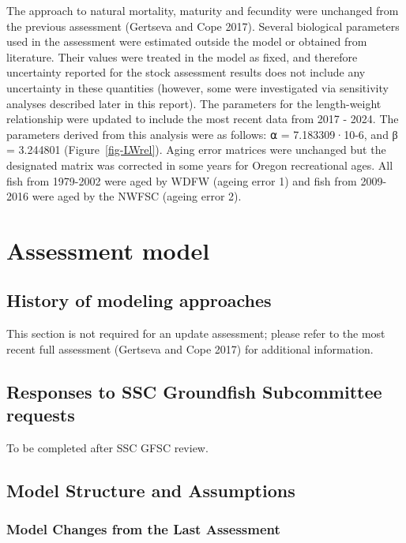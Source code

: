 \documentclass[
]{scrartcl}
\begin{document}
The approach to natural mortality, maturity and fecundity were unchanged
from the previous assessment (Gertseva and Cope 2017). Several
biological parameters used in the assessment were estimated outside the
model or obtained from literature. Their values were treated in the
model as fixed, and therefore uncertainty reported for the stock
assessment results does not include any uncertainty in these quantities
(however, some were investigated via sensitivity analyses described
later in this report). The parameters for the length-weight relationship
were updated to include the most recent data from 2017 - 2024. The
parameters derived from this analysis were as follows: ⍺ =
7.183309·10-6, and β = 3.244801 (Figure~\ref{fig-LWrel}). Aging error
matrices were unchanged but the designated matrix was corrected in some
years for Oregon recreational ages. All fish from 1979-2002 were aged by
WDFW (ageing error 1) and fish from 2009-2016 were aged by the NWFSC
(ageing error 2).

\newpage{}

\section{Assessment model}\label{assessment-model}

\subsection{History of modeling
approaches}\label{history-of-modeling-approaches}

This section is not required for an update assessment; please refer to
the most recent full assessment (Gertseva and Cope 2017) for additional
information.

\subsection{Responses to SSC Groundfish Subcommittee
requests}\label{responses-to-ssc-groundfish-subcommittee-requests}

To be completed after SSC GFSC review.

\subsection{Model Structure and
Assumptions}\label{model-structure-and-assumptions}

\subsubsection{Model Changes from the Last
Assessment}\label{sec-changes}
\end{document}
